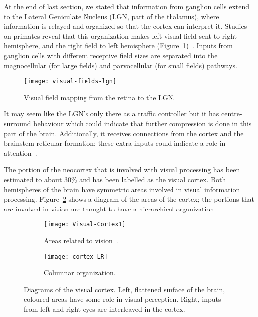 At the end of last section, we stated that information from ganglion cells extend to the Lateral Geniculate Nucleus (LGN, part of the thalamus), where information is relayed and organized so that the cortex can interpret it. Studies on primates reveal that this organization makes left visual field sent to right hemisphere, and the right field to left hemisphere (Figure~\ref{fig:vision:optic-chiasm})~\cite{thompson2000brain}. Inputs from ganglion cells with different receptive field sizes are separated into the magnocellular (for large fields) and parvocellular (for small fields) pathways.

\begin{figure}[h]
  \begin{center}
    \texttt{[image: visual-fields-lgn]}
    \caption{Visual field mapping from the retina to the LGN.}
    \label{fig:vision:optic-chiasm}
  \end{center}
\end{figure}

It may seem like the LGN's only there as a traffic controller but it has centre-surround behaviour which could indicate that further compression is done in this part of the brain. Additionally, it receives connections from the cortex and the brainstem reticular formation; these extra inputs could indicate a role in attention~\cite{eye-brain-vision-hubel1995}.

The portion of the neocortex that is involved with visual processing has been estimated to about 30\% and has been labelled as the visual cortex. Both hemispheres of the brain have symmetric areas involved in visual information processing. Figure~\ref{fig:vision:visual-cortex} shows a diagram of the areas of the cortex; the portions that are involved in vision are thought to have a hierarchical organization.

\begin{figure}[h]
  \begin{center}
    \begin{subfigure}[b]{0.65\textwidth}
      \texttt{[image: Visual-Cortex1]}
      \caption{Areas related to vision~\cite{webvision-images}.}
      \label{fig:vision:visual-cortex}
    \end{subfigure}
    \begin{subfigure}[b]{0.34\textwidth}
      \texttt{[image: cortex-LR]}
      \caption{Columnar organization.}
      \label{fig:vision:visual-cortex-LR}
    \end{subfigure}
    \caption{Diagrams of the visual cortex. Left, flattened surface of the brain, coloured areas have some role in visual perception. Right, inputs from left and right eyes are interleaved in the cortex. }
  \end{center}
\end{figure}

